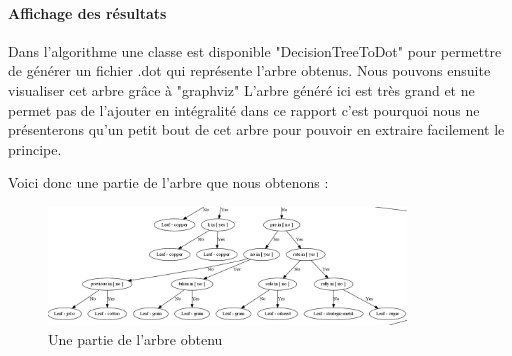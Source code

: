 \paragraph{Affichage des résultats}
Dans l'algorithme une classe est disponible "DecisionTreeToDot" pour permettre de générer un fichier .dot qui représente l'arbre obtenus. Nous pouvons ensuite visualiser cet arbre grâce à "graphviz"
L'arbre généré ici est très grand et ne permet pas de l'ajouter en intégralité dans ce rapport c'est pourquoi nous ne présenterons qu'un petit bout de cet arbre pour pouvoir en extraire facilement le principe. 

Voici donc une partie de l'arbre que nous obtenons :

\begin{figure}[h]									%
\centering										%
\includegraphics[width=95mm]{./arbre.png}	%
\caption{Une partie de l'arbre obtenu}		%
\label{deviceWindow}								%
\end{figure}

